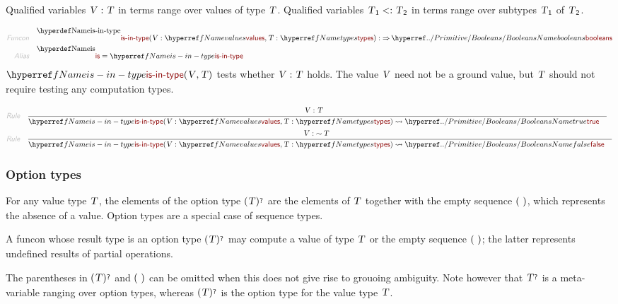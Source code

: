 Qualified variables $\SHADE{\VAR{V} : \VAR{T}}$ in terms range over values of type $\SHADE{\VAR{T}}$.
  Qualified variables $\SHADE{\VAR{T}\SUB{1} <: \VAR{T}\SUB{2}}$ in terms range over subtypes $\SHADE{\VAR{T}\SUB{1}}$ of $\SHADE{\VAR{T}\SUB{2}}$.

\begin{align*}
  \KEY{Funcon} \quad
  & \NAMEDECL{is-in-type}(
                       \VAR{V} : \NAMEREF{values}, \VAR{T} : \NAMEREF{types}) 
    :  \TO \NAMEHYPER{../Primitive}{Booleans}{booleans} 
\\
  \KEY{Alias} \quad
  & \NAMEDECL{is} = \NAMEREF{is-in-type}
\end{align*}
$\SHADE{\NAMEREF{is-in-type}
           (  \VAR{V}, 
                  \VAR{T} )}$ tests whether $\SHADE{ \VAR{V} : \VAR{T}}$ holds. The value $\SHADE{\VAR{V}}$ need not be a
  ground value, but $\SHADE{\VAR{T}}$ should not require testing any computation types.

\begin{align*}
  \KEY{Rule} \quad
    & \RULE{
      &  \VAR{V} : \VAR{T}
      }{
      & \NAMEREF{is-in-type}
          (  \VAR{V} : \NAMEREF{values}, 
                 \VAR{T} : \NAMEREF{types} ) \leadsto 
          \NAMEHYPER{../Primitive}{Booleans}{true}
      }
\\
  \KEY{Rule} \quad
    & \RULE{
      &  \VAR{V} : \mathop{\sim} \VAR{T}
      }{
      & \NAMEREF{is-in-type}
          (  \VAR{V} : \NAMEREF{values}, 
                 \VAR{T} : \NAMEREF{types} ) \leadsto 
          \NAMEHYPER{../Primitive}{Booleans}{false}
      }
\end{align*}
\subsubsection{Option types}\hypertarget{option-types}{}\label{option-types}

For any value type $\SHADE{\VAR{T}}$, the elements of the option type $\SHADE{(  \VAR{T} )\QUERY}$ are the
  elements of $\SHADE{\VAR{T}}$ together with the empty sequence $\strut(   \  )\strut$, which represents
  the absence of a value. Option types are a special case of sequence types.

A funcon whose result type is an option type $\SHADE{(  \VAR{T} )\QUERY}$ may compute a value of
  type $\SHADE{\VAR{T}}$ or the empty sequence $\strut(   \  )\strut$; the latter represents undefined results
  of partial operations.

The parentheses in $\SHADE{(  \VAR{T} )\QUERY}$ and $\strut(   \  )\strut$ can be omitted when this does not give
  rise to grouoing ambiguity. Note however that $\SHADE{\VAR{T}\QUERY}$ is a meta-variable ranging
  over option types, whereas $\SHADE{(  \VAR{T} )\QUERY}$ is the option type for the value type $\SHADE{\VAR{T}}$.

